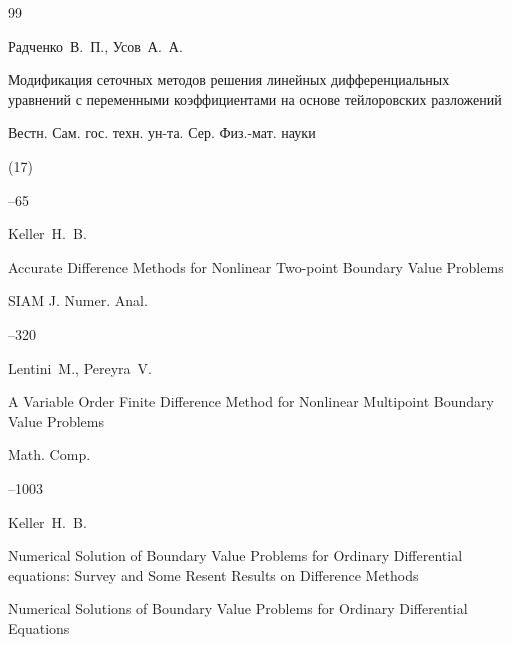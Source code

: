 \begin{thebibliography}{99}




\by Радченко~В.~П., Усов~А.~А.

\paper Модификация сеточных методов решения линейных дифференциальных уравнений с переменными коэффициентами на основе тейлоровских разложений

\jour Вестн. Сам. гос. техн. ун-та. Сер. Физ.-мат. науки


(17)

--65






\by Keller~H.~B.

\paper Accurate Difference Methods for Nonlinear Two-point Boundary Value Problems

\jour SIAM J. Numer. Anal.





--320




\by Lentini~M., Pereyra~V.

\paper A Variable Order Finite Difference Method for Nonlinear Multipoint Boundary Value Problems

\jour Math. Comp.




--1003







\by Keller~H.~B.

\paper Numerical Solution of Boundary Value Problems for Ordinary Differential equations: Survey and Some Resent Results on Difference Methods

\inbook Numerical Solutions of Boundary Value Problems for Ordinary Differential Equations


\end{thebibliography}
